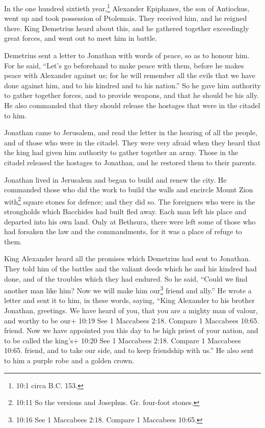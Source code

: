  In the one hundred sixtieth year,\footnote{10:1 circa B.C.
  153.} Alexander Epiphanes, the son of Antiochus, went up and took
possession of Ptolemais. They received him, and he reigned there.
 King Demetrius heard about this, and he gathered together
exceedingly great forces, and went out to meet him in battle.

 Demetrius sent a letter to Jonathan with words of peace, so
as to honour him.  For he said, ``Let's go beforehand to
make peace with them, before he makes peace with Alexander against us;
 for he will remember all the evils that we have done
against him, and to his kindred and to his nation.''  So he
gave him authority to gather together forces, and to provide weapons,
and that he should be his ally. He also commanded that they should
release the hostages that were in the citadel to him.

 Jonathan came to Jerusalem, and read the letter in the
hearing of all the people, and of those who were in the citadel.
 They were very afraid when they heard that the king had
given him authority to gather together an army.  Those in
the citadel released the hostages to Jonathan, and he restored them to
their parents.

 Jonathan lived in Jerusalem and began to build and renew
the city.  He commanded those who did the work to build the
walls and encircle Mount Zion with\footnote{10:11 So the versions and
  Josephus. Gr. four-foot stones.} square stones for defence; and they
did so.  The foreigners who were in the strongholds which
Bacchides had built fled away.  Each man left his place and
departed into his own land.  Only at Bethsura, there were
left some of those who had forsaken the law and the commandments, for it
was a place of refuge to them.

 King Alexander heard all the promises which Demetrius had
sent to Jonathan. They told him of the battles and the valiant deeds
which he and his kindred had done, and of the troubles which they had
endured.  So he said, ``Could we find another man like him?
Now we will make him our\footnote{10:16 See 1 Maccabees 2:18. Compare 1
  Maccabees 10:65.} friend and ally.''  He wrote a letter
and sent it to him, in these words, saying,  ``King
Alexander to his brother Jonathan, greetings.  We have
heard of you, that you are a mighty man of valour, and worthy to be our+
10:19 See 1 Maccabees 2:18. Compare 1 Maccabees 10:65. friend.
 Now we have appointed you this day to be high priest of
your nation, and to be called the king's+ 10:20 See 1 Maccabees 2:18.
Compare 1 Maccabees 10:65. friend, and to take our side, and to keep
friendship with us.'' He also sent to him a purple robe and a golden
crown.

